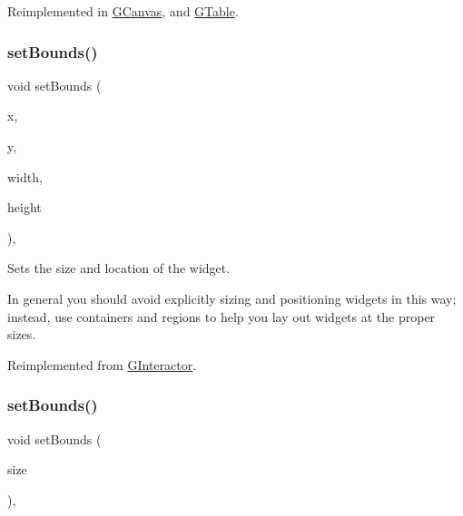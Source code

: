 Reimplemented in \mbox{\hyperlink{classsgl_1_1GCanvas_a9cb99695b93494c7ba28268ce9e42c2a}{G\+Canvas}}, and \mbox{\hyperlink{classsgl_1_1GTable_a9cb99695b93494c7ba28268ce9e42c2a}{G\+Table}}.

\mbox{\label{classsgl_1_1GLabel_ab9f89f193ad29d66c547cfee29ffde39}} 
\subsubsection{\texorpdfstring{set\+Bounds()}{setBounds()}\hspace{0.1cm}{\footnotesize\ttfamily [1/2]}}
{\footnotesize\ttfamily void set\+Bounds (\begin{DoxyParamCaption}\item[{double}]{x,  }\item[{double}]{y,  }\item[{double}]{width,  }\item[{double}]{height }\end{DoxyParamCaption})\hspace{0.3cm}{\ttfamily [override]}, {\ttfamily [virtual]}}



Sets the size and location of the widget. 

In general you should avoid explicitly sizing and positioning widgets in this way; instead, use containers and regions to help you lay out widgets at the proper sizes. 

Reimplemented from \mbox{\hyperlink{classsgl_1_1GInteractor_a2aae8197624b72265ab83b4f1bc73f2f}{G\+Interactor}}.

\mbox{\label{classsgl_1_1GLabel_adb836652705fdc4b7e90b7a3afc56a37}} 
\subsubsection{\texorpdfstring{set\+Bounds()}{setBounds()}\hspace{0.1cm}{\footnotesize\ttfamily [2/2]}}
{\footnotesize\ttfamily void set\+Bounds (\begin{DoxyParamCaption}\item[{const \mbox{\hyperlink{structsgl_1_1GRectangle}{G\+Rectangle}} \&}]{size }\end{DoxyParamCaption})\hspace{0.3cm}{\ttfamily [override]}, {\ttfamily [virtual]}}



